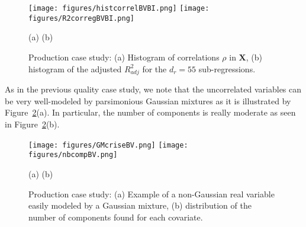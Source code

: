 \documentclass[12pt,a4paper]{report}
\begin{document}
\begin{figure}[h!]
\begin{center}
			\texttt{[image: figures/histcorrelBVBI.png]}
			\texttt{[image: figures/R2corregBVBI.png]}
\end{center}
\vspace{-5mm}
			\centerline{(a) \hspace{130px} (b)}
			\caption{Production case study: (a) Histogram of correlations $\rho$ in $\boldsymbol{X}$, (b) histogram of the adjusted $R^2_{adj}$ for the $d_r=55$ sub-regressions.}\label{fig:graphCorr.production}
\end{figure}  	

\vspace{3mm}

As in the previous quality case study, we note that the uncorrelated variables can be very well-modeled by parsimonious Gaussian mixtures as it is illustrated by Figure~\ref{fig:graphMixmod.production}(a). In particular, the number of components is really moderate as seen in Figure~\ref{fig:graphMixmod.production}(b).

\vspace{3mm}

		\begin{figure}[h!]
\begin{center}
			\texttt{[image: figures/GMcriseBV.png]}
			\texttt{[image: figures/nbcompBV.png]}
\end{center}
\vspace{-5mm}
			\centerline{(a) \hspace{130px} (b)}
			\caption{Production case study: (a) Example of a non-Gaussian real variable easily modeled by a Gaussian mixture, (b) distribution of the number of components found for each covariate.}\label{fig:graphMixmod.production}
\end{figure}  	

		
		
%  		
  			
\end{document}
